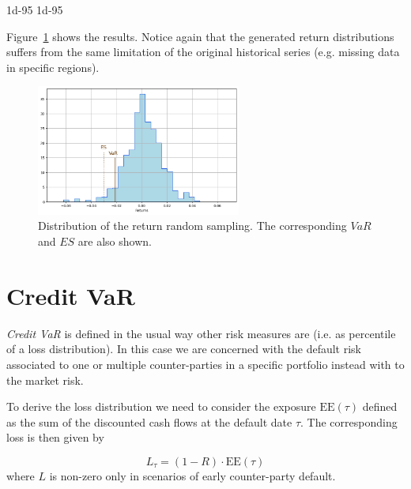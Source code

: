 \begin{ioutput}
1d-95%
1d-95%
\end{ioutput}

Figure~\ref{fig:historical_var} shows the results. Notice again that the generated return distributions suffers from the same limitation of the original historical series (e.g. missing data in specific regions).

\begin{figure}[htb]
\centering
\includegraphics[width=0.6\textwidth]{figures/historical_var}
\caption{Distribution of the return random sampling. The corresponding $VaR$ and $ES$ are also shown.}
\label{fig:historical_var}
\end{figure}

\section{Credit VaR}
\label{credit-var-cr-var}


\emph{Credit VaR} is defined in the usual way other risk measures are (i.e. as percentile of a loss distribution). In this case we are concerned with the default risk associated to one or multiple counter-parties in a specific portfolio instead with to the market risk.

To derive the loss distribution we need to consider the exposure $\text{EE}(\tau)$ defined as the sum of the discounted cash flows at the default date $\tau$. The corresponding loss is then given by

\begin{equation}
L_{\tau} = (1 - R) \cdot \textrm{EE}(\tau)
\end{equation}
where $L$ is non-zero only in scenarios of early counter-party default. 


